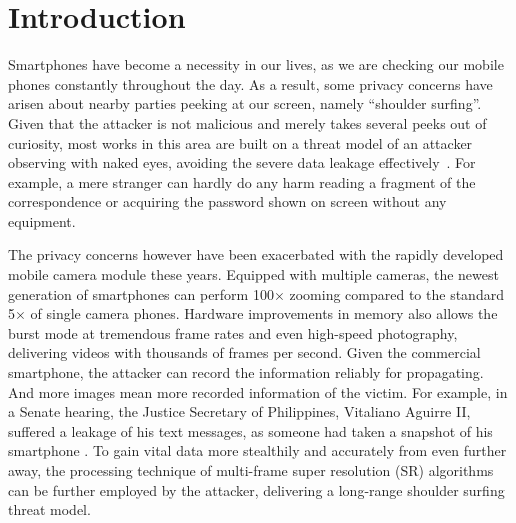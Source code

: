 \section{Introduction}
\label{sec-introduction}

Smartphones have become a necessity in our lives, as we are checking our mobile phones constantly throughout the day. As a result, some privacy concerns have arisen about nearby parties peeking at our screen, namely ``shoulder surfing''. 
Given that the attacker is not malicious and merely takes several peeks out of curiosity, most works in this area are built on a threat model of an attacker observing with naked eyes, avoiding the severe data leakage effectively~\cite{eiband2017understanding}. For example, a mere stranger can hardly do any harm reading a fragment of the correspondence or acquiring the password shown on screen without any equipment.


The privacy concerns however have been exacerbated with the rapidly developed mobile camera module these years. Equipped with multiple cameras, the newest generation of smartphones can perform 100$\times$ zooming compared to the standard 5$\times$ of single camera phones. Hardware improvements in memory also allows the burst mode at tremendous frame rates and even high-speed photography, delivering videos with thousands of frames per second. Given the commercial smartphone, the attacker can record the information reliably for propagating. And more images mean more recorded information of the victim. For example, in a Senate hearing, the Justice Secretary of Philippines, Vitaliano Aguirre II, suffered a leakage of his text messages, as someone had taken a snapshot of his smartphone \cite{Polotiko2017leakage}. To gain vital data more stealthily and accurately from even further away, the processing technique of multi-frame super resolution (SR) algorithms can be further employed by the attacker, delivering a long-range shoulder surfing threat model.

